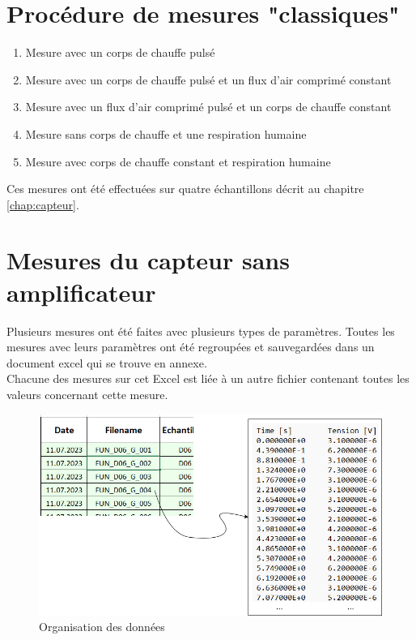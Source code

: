 \section{Procédure de mesures "classiques"}
\begin{enumerate}
    \item Mesure avec un corps de chauffe pulsé\\
    \item Mesure avec un corps de chauffe pulsé et un flux d'air comprimé constant\\
    \item Mesure avec un flux d'air comprimé pulsé et un corps de chauffe constant\\
    \item Mesure sans corps de chauffe et une respiration humaine\\
    \item Mesure avec corps de chauffe constant et respiration humaine
\end{enumerate}

Ces mesures ont été effectuées sur quatre échantillons décrit au chapitre \ref{chap:capteur}. 

\section{Mesures du capteur sans amplificateur}
Plusieurs mesures ont été faites avec plusieurs types de paramètres. Toutes les mesures avec leurs paramètres ont été regroupées et sauvegardées
dans un document excel qui se trouve en annexe.\\
Chacune des mesures sur cet Excel est liée à un autre fichier contenant toutes les valeurs concernant cette mesure.
\begin{figure}[H]
    \centering
    \includegraphics[scale = 0.4]{assets/figures/Data.png}
    \caption{Organisation des données}
    \label{fig:data_orga}
\end{figure}

